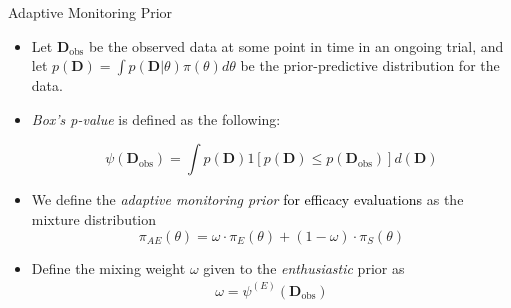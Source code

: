 \documentclass{beamer}
\begin{document}
\begin{frame}{Adaptive Monitoring Prior}
\begin{itemize}
\item Let $\mathbf{D}_{\text{obs}}$ be the observed data at some point in time in an ongoing trial, and let $p(\mathbf{D}) =\int p(\mathbf{D}|\theta)\pi(\theta)d\theta$ be the prior-predictive distribution for the data.

\item \textit{Box's p-value} is defined as the following:

\begin{equation}\label{eq:box_p}
\psi({\mathbf{D}_{\text{obs}}})=\int {p(\mathbf{D})}  1[p(\mathbf{D})\leq p(\mathbf{D}_{\text{obs}})] d(\mathbf{D})
\end{equation}

\item 
We define the \textit{adaptive monitoring prior} \textcolor{black}{for efficacy evaluations} as the mixture distribution	
\begin{equation}\label{eq:inference_prior}
	\pi_{AE}\left(\theta\right)=\omega\cdot\pi_E(\theta)+(1 - \omega)\cdot \pi_S(\theta)
\end{equation}
\item
Define the mixing weight $\omega$ given to the \textit{enthusiastic} prior as
\begin{align}\label{eq:omega}
\omega= \psi^{(E)}(\mathbf{D}_{\text{obs}})
\end{align}
\end{itemize}
\end{frame}
\end{document}
